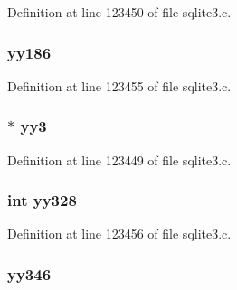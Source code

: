 Definition at line 123450 of file sqlite3.\+c.

\hypertarget{union_y_y_m_i_n_o_r_t_y_p_e_af1c2f4cf68876158541b6fbb08508d9c}{}
\subsubsection[{yy186}]{ yy186}\label{union_y_y_m_i_n_o_r_t_y_p_e_af1c2f4cf68876158541b6fbb08508d9c}


Definition at line 123455 of file sqlite3.\+c.

\hypertarget{union_y_y_m_i_n_o_r_t_y_p_e_a6d4889fe33d2ca4eba086973aee4c755}{}
\subsubsection[{yy3}]{$\ast$ yy3}\label{union_y_y_m_i_n_o_r_t_y_p_e_a6d4889fe33d2ca4eba086973aee4c755}


Definition at line 123449 of file sqlite3.\+c.

\hypertarget{union_y_y_m_i_n_o_r_t_y_p_e_ac69f548f34beb69c83e03ae8d6b5a699}{}
\subsubsection[{yy328}]{\setlength{\rightskip}{0pt plus 5cm}int yy328}\label{union_y_y_m_i_n_o_r_t_y_p_e_ac69f548f34beb69c83e03ae8d6b5a699}


Definition at line 123456 of file sqlite3.\+c.

\hypertarget{union_y_y_m_i_n_o_r_t_y_p_e_a6ba7dcd49df63a355123e3c02f2c6e8e}{}
\subsubsection[{yy346}]{ yy346}\label{union_y_y_m_i_n_o_r_t_y_p_e_a6ba7dcd49df63a355123e3c02f2c6e8e}


